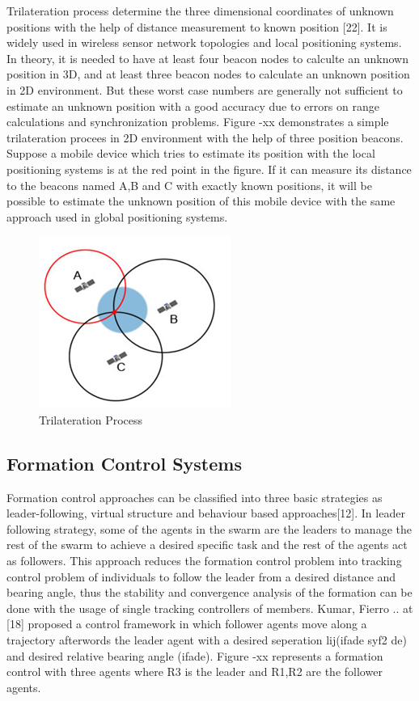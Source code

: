 \documentclass[twoside]{article}
\begin{document}
Trilateration process determine the three dimensional coordinates of unknown positions with the help of distance measurement to known position [22].  It is widely used in wireless sensor network topologies and local positioning systems.  In theory, it is needed to have at least four beacon nodes to calculte an unknown position in 3D, and at least three beacon nodes to calculate an unknown position in 2D environment. But these worst case numbers are generally not sufficient to estimate an unknown position with a good accuracy due to errors on range calculations and synchronization problems. Figure -xx demonstrates a simple trilateration procees in 2D environment with the help of  three position beacons. Suppose a mobile device which tries to estimate its position with the local positioning systems is at the red point in the figure. If it can measure its distance to the beacons named A,B and C with exactly known positions, it will be possible to estimate the unknown position of this mobile device with the same approach used in global positioning systems. 


\begin{figure}[H]
	\caption{Trilateration Process}
	\centering
	\includegraphics[scale = 1]{trilateration}
\end{figure}



\subsection{Formation Control Systems}

Formation control approaches can be classified into three basic strategies as leader-following, virtual structure and behaviour based approaches[12].  In leader following strategy, some of the agents in the swarm are the leaders to manage the rest of the swarm to achieve a desired specific task and the rest of the agents act as followers. This approach reduces the formation control problem into tracking control problem of individuals to follow the leader from a desired distance and bearing angle, thus the stability and convergence analysis of the formation can be done with the usage of single tracking controllers of members. Kumar, Fierro .. at [18] proposed a control framework in which follower agents move along a trajectory afterwords the leader agent with a desired seperation lij(ifade syf2 de) and desired relative bearing angle (ifade).  Figure -xx represents a formation control with three agents where R3 is the leader and R1,R2 are the follower agents. 
\end{document}
